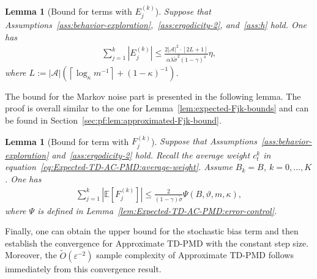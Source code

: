\documentclass[10pt]{article}
\newcommand{\calA}{\mathcal{A}}
\newcommand{\E}{\mathbb{E}}
\newcommand{\ls}{\left}
\newcommand{\rs}{\right}
\theoremstyle{plain}
\newtheorem{lemma}[theorem]{Lemma}
\theoremstyle{definition}
\begin{document}
\begin{lemma}[Bound for terms with $E_j^{(k)}$]
    Suppose that Assumptions~\ref{ass:behavior-exploration},~\ref{ass:ergodicity-2}, and~\ref{ass:h} hold. One has
    \begin{align*}
        \sum_{j=1}^k \ls| E_j^{(k)} \rs| \leq \frac{2|\calA|^2 \cdot [2L+1]}{\alpha \lambda \tilde\sigma^2 (1-\gamma)^4}\eta,
    \end{align*}
    where $L := |\calA| \ls( \ls\lceil \log_\kappa m^{-1} \rs\rceil + (1-\kappa)^{-1} \rs)$.
    \label{lem:approximated-Ejk-bound}
\end{lemma}
The bound for the Markov noise part is presented in the following lemma. {The proof is overall similar to the one for Lemma~\ref{lem:expected-Fjk-bounds} and can be found in Section~\ref{sec:pf:lem:approximated-Fjk-bound}.}
\begin{lemma}[Bound for term with $F_j^{(k)}$]
    Suppose that Assumptions~\ref{ass:behavior-exploration} and~\ref{ass:ergodicity-2} hold. Recall the average weight $c_t^k$ in equation~\eqref{eq:Expected-TD-AC-PMD:average-weight}. Assume $B_k = B$, $k=0, \dots, K$. One has
    \begin{align*}
        \sum_{j=1}^k \ls| \E\ls[F_j^{(k)}\rs] \rs| \leq \frac{2}{(1-\gamma)\tilde\sigma} \Psi(B, \vartheta, m, \kappa),
    \end{align*}
    where $\Psi$ is defined in Lemma~\ref{lem:Expected-TD-AC-PMD:error-control}.
    \label{lem:approximated-Fjk-bound}
\end{lemma}
 
 Finally, one can obtain the upper bound for the stochastic bias term  and then establish the convergence for Approximate TD-PMD with the constant step size. Moreover, the $\tilde{O}(\varepsilon^{-2})$ sample complexity of Approximate TD-PMD follows immediately from this convergence result.%
\end{document}
